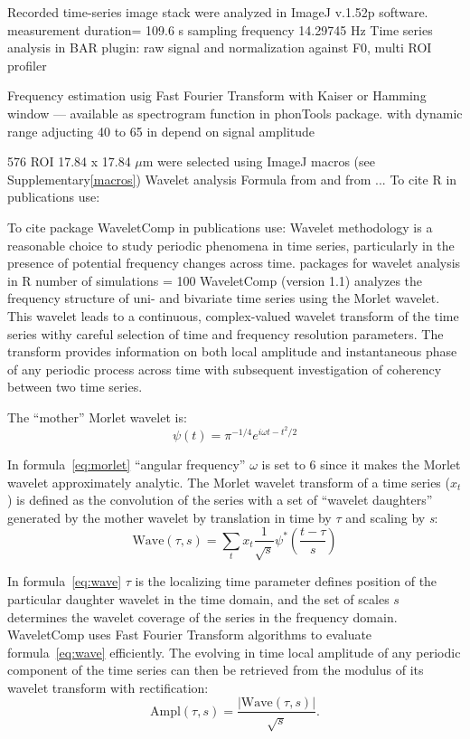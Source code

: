 \documentclass{biophys-new}
\begin{document}
Recorded time-series image stack were analyzed in ImageJ v.1.52p software\cite{rueden2017imagej2}.
measurement duration= 109.6 s sampling frequency 14.29745 Hz
Time series analysis in BAR plugin: raw signal and
normalization against F0, multi ROI profiler


Frequency estimation usig Fast Fourier Transform with Kaiser or Hamming window --- available as spectrogram function in phonTools package.
with dynamic range adjucting 40 to 65 in depend on signal amplitude

576 ROI 17.84 x 17.84 $\mu$m were selected using ImageJ macros (see Supplementary\ref{macros})
Wavelet analysis
Formula from \cite{grinsted2004application} and from \cite{kahraman2016multiple} ...
To cite R in publications use:  \cite{team2014r}

To cite package WaveletComp in publications use: \cite{rosch2016waveletcomp}
Wavelet methodology is a reasonable choice to study periodic phenomena in time series, particularly in
the presence of potential frequency changes across time.
packages for wavelet analysis in R
number of simulations = 100
WaveletComp (version 1.1) analyzes the frequency structure of uni- and bivariate time series using the Morlet wavelet.
This wavelet leads to a continuous, complex-valued wavelet transform of the time series withy careful selection of time and frequency resolution parameters. The transform provides information on both local amplitude and instantaneous phase of any periodic process across time with subsequent investigation of coherency between two time series.


The “mother” Morlet wavelet is:
\begin{equation}\label{eq:morlet}
\psi(t)=\pi^{-1/4}e^{i\omega t-{t^2}/2}
\end{equation}


In formula~\ref{eq:morlet} “angular frequency” $\omega$ is set to 6 since it makes the Morlet wavelet approximately analytic.
The Morlet wavelet transform of a time series (${x}_{t}$) is defined as the convolution of the series with a set of “wavelet daughters” generated by the mother wavelet by translation in time by $\tau$ and scaling by \textit{s}:
\begin{equation}\label{eq:wave}
\text{Wave}(\tau, s)=\sum_{t}x_{t}\frac{1}{\sqrt{s}}\psi^{\ast}\left(\frac{t-\tau}{s}\right)
\end{equation}

In formula~\ref{eq:wave} $\tau$ is the localizing time parameter defines position of the particular daughter wavelet in the time domain, and the set of scales $s$ determines the wavelet coverage of the series in the frequency domain.
WaveletComp uses Fast Fourier Transform algorithms to evaluate formula~\ref{eq:wave} efficiently.
The evolving in time local amplitude of any periodic component of the time series can then be retrieved from the modulus of its wavelet transform with rectification:
\begin{equation}\label{eq:amplitude}
\text{Ampl}(\tau, s)=\frac{|\text{Wave}(\tau, s)|}{\sqrt{s}}.
\end{equation}
\end{document}
